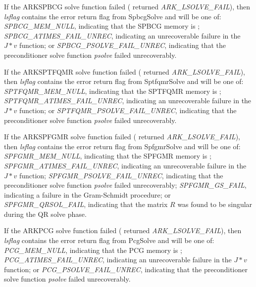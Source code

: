 \documentclass[letterpaper,10pt,english]{sphinxmanual}
\begin{document}
\begin{fulllineitems}
If the ARKSPBCG solve function failed ({\hyperref[c_interface/User_callable:ARKode]{}}
returned \emph{ARK\_LSOLVE\_FAIL}), then \emph{lsflag} contains the error
return flag from SpbcgSolve and will be one of:
\emph{SPBCG\_MEM\_NULL}, indicating that the SPBCG memory is
; \emph{SPBCG\_ATIMES\_FAIL\_UNREC}, indicating an unrecoverable
failure in the $J*v$ function; or
\emph{SPBCG\_PSOLVE\_FAIL\_UNREC}, indicating that the preconditioner
solve function \emph{psolve} failed unrecoverably.

If the ARKSPTFQMR solve function failed ({\hyperref[c_interface/User_callable:ARKode]{}}
returned \emph{ARK\_LSOLVE\_FAIL}), then \emph{lsflag} contains the error
return flag from SptfqmrSolve and will be one of:
\emph{SPTFQMR\_MEM\_NULL}, indicating that the SPTFQMR memory is
; \emph{SPTFQMR\_ATIMES\_FAIL\_UNREC}, indicating an
unrecoverable failure in the $J*v$ function; or
\emph{SPTFQMR\_PSOLVE\_FAIL\_UNREC}, indicating that the preconditioner
solve function \emph{psolve} failed unrecoverably.

If the ARKSPFGMR solve function failed ({\hyperref[c_interface/User_callable:ARKode]{}}
returned \emph{ARK\_LSOLVE\_FAIL}), then \emph{lsflag} contains the error
return flag from SpfgmrSolve and will be one of:
\emph{SPFGMR\_MEM\_NULL}, indicating that the SPFGMR memory is
; \emph{SPFGMR\_ATIMES\_FAIL\_UNREC}, indicating an unrecoverable
failure in the $J*v$ function; \emph{SPFGMR\_PSOLVE\_FAIL\_UNREC},
indicating that the preconditioner solve function \emph{psolve} failed
unrecoverably; \emph{SPFGMR\_GS\_FAIL}, indicating a failure in the
Gram-Schmidt procedure; or \emph{SPFGMR\_QRSOL\_FAIL}, indicating that
the matrix $R$ was found to be singular during the QR solve
phase.

If the ARKPCG solve function failed ({\hyperref[c_interface/User_callable:ARKode]{}}
returned \emph{ARK\_LSOLVE\_FAIL}), then \emph{lsflag} contains the error
return flag from PcgSolve and will be one of:
\emph{PCG\_MEM\_NULL}, indicating that the PCG memory is
; \emph{PCG\_ATIMES\_FAIL\_UNREC}, indicating an unrecoverable
failure in the $J*v$ function; or
\emph{PCG\_PSOLVE\_FAIL\_UNREC}, indicating that the preconditioner
solve function \emph{psolve} failed unrecoverably.

\end{fulllineitems}

\end{document}
